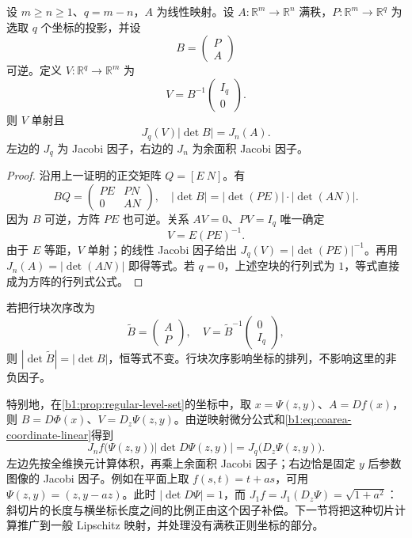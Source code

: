 \begin{proposition}
\label{b1:prop:coarea-coordinate-identity}
设 \(m\ge n\ge1\)、\(q=m-n\)，\(A\) 为线性映射。设 \(A:\mathbb R^m\rightarrow\mathbb R^n\) 满秩，\(P:\mathbb R^m\rightarrow\mathbb R^q\) 为选取 \(q\) 个坐标的投影，并设
\[
 B=\begin{pmatrix}P\\A\end{pmatrix}
\]
可逆。定义 \(V:\mathbb R^q\rightarrow\mathbb R^m\) 为
\[
 V=B^{-1}\begin{pmatrix}I_q\\0\end{pmatrix}.
\]
则 \(V\) 单射且
\begin{equation}
\label{b1:eq:coarea-coordinate-linear}
 J_q(V)|\det B|=J_n(A).
\end{equation}
左边的 \(J_q\) 为 Jacobi 因子，右边的 \(J_n\) 为余面积 Jacobi 因子。
\end{proposition}
\begin{proof}
沿用上一证明的正交矩阵 \(Q=[E\ N]\)。有
\[
 BQ=\begin{pmatrix}PE&PN\\0&AN\end{pmatrix},\quad
 |\det B|=|\det(PE)|\cdot|\det(AN)|.
\]
因为 \(B\) 可逆，方阵 \(PE\) 也可逆。关系 \(AV=0\)、\(PV=I_q\) 唯一确定
\[
 V=E(PE)^{-1}.
\]
由于 \(E\) 等距，\(V\) 单射；的线性 Jacobi 因子给出 \(J_q(V)=|\det(PE)|^{-1}\)。再用 \(J_n(A)=|\det(AN)|\) 即得等式。若 \(q=0\)，上述空块的行列式为 \(1\)，等式直接成为方阵的行列式公式。
\end{proof}

若把行块次序改为
\[
 \widetilde B=\begin{pmatrix}A\\P\end{pmatrix},\quad
 V=\widetilde B^{-1}\begin{pmatrix}0\\I_q\end{pmatrix},
\]
则 \(|\det\widetilde B|=|\det B|\)，恒等式不变。行块次序影响坐标的排列，不影响这里的非负因子。

\ProseParagraphBreak

特别地，在\cref{b1:prop:regular-level-set}的坐标中，取 \(x=\Psi(z,y)\)、\(A=Df(x)\)，则 \(B=D\Phi(x)\)、\(V=D_z\Psi(z,y)\)。由逆映射微分公式和\eqref{b1:eq:coarea-coordinate-linear}得到
\begin{equation}
\label{b1:eq:coarea-coordinate-smooth}
 J_nf\bigl(\Psi(z,y)\bigr)\bigl|\det D\Psi(z,y)\bigr|
 =J_q\bigl(D_z\Psi(z,y)\bigr).
\end{equation}
左边先按全维换元计算体积，再乘上余面积 Jacobi 因子；右边恰是固定 \(y\) 后参数图像的 Jacobi 因子。例如在平面上取 \(f(s,t)=t+as\)，可用 \(\Psi(z,y)=(z,y-az)\)。此时 \(|\det D\Psi|=1\)，而 \(J_1f=J_1(D_z\Psi)=\sqrt{1+a^2}\)：斜切片的长度与横坐标长度之间的比例正由这个因子补偿。下一节将把这种切片计算推广到一般 Lipschitz 映射，并处理没有满秩正则坐标的部分。
